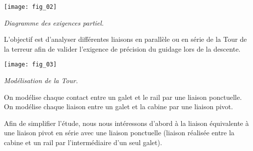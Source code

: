 \begin{multicols}{2}
\begin{multicols}{2}
\begin{center}
\texttt{[image: fig\_02]}

\textit{Diagramme des exigences partiel.}
\end{center}

%

\begin{obj}
L'objectif est d'analyser différentes liaisons en parallèle ou en série de la Tour de la terreur afin de valider l'exigence de précision du guidage lors de la descente.
\end{obj}




\begin{center}
\texttt{[image: fig\_03]}

\textit{Modélisation de la Tour.}
\end{center}

%
%
%

On modélise chaque contact entre un galet et le rail par une liaison 
ponctuelle.  On modélise chaque liaison entre un galet et la cabine par une liaison pivot.

Afin de simplifier l'étude, nous nous intéressons d'abord à la liaison équivalente à une liaison pivot en série avec une liaison ponctuelle (liaison réalisée entre la cabine et un rail par l'intermédiaire d'un seul galet).


\end{multicols}
\end{multicols}
